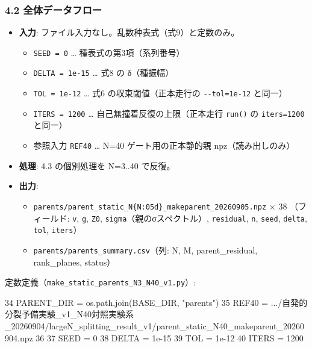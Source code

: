 \documentclass[
  a4paper,
]{ltjsarticle}
\newenvironment{Shaded}{}{}
\newcommand{\DecValTok}[1]{\textcolor[rgb]{0.25,0.63,0.44}{#1}}
\newcommand{\FloatTok}[1]{\textcolor[rgb]{0.25,0.63,0.44}{#1}}
\newcommand{\NormalTok}[1]{#1}
\newcommand{\OperatorTok}[1]{\textcolor[rgb]{0.40,0.40,0.40}{#1}}
\newcommand{\StringTok}[1]{\textcolor[rgb]{0.25,0.44,0.63}{#1}}
\providecommand{\tightlist}{%
  \setlength{\itemsep}{0pt}\setlength{\parskip}{0pt}}
\begin{document}
\subsubsection{4.2
全体データフロー}\label{ux5168ux4f53ux30c7ux30fcux30bfux30d5ux30edux30fc}

\begin{itemize}
\tightlist
\item
  \textbf{入力}: ファイル入力なし。乱数种表式（式9）と定数のみ。

  \begin{itemize}
  \tightlist
  \item
    \texttt{SEED\ =\ 0} \ldots{} 種表式の第3項（系列番号）
  \item
    \texttt{DELTA\ =\ 1e-15} \ldots{} 式8 の δ（種振幅）
  \item
    \texttt{TOL\ =\ 1e-12} \ldots{} 式6 の収束閾値（正本走行の
    \texttt{-\/-tol=1e-12} と同一）
  \item
    \texttt{ITERS\ =\ 1200} \ldots{} 自己無撞着反復の上限（正本走行
    \texttt{run()} の \texttt{iters=1200} と同一）
  \item
    参照入力 \texttt{REF40} \ldots{} N=40 ゲート用の正本静的親
    npz（読み出しのみ）
  \end{itemize}
\item
  \textbf{処理}: 4.3 の個別処理を N=3..40 で反復。
\item
  \textbf{出力}:

  \begin{itemize}
  \tightlist
  \item
    \texttt{parents/parent\_static\_N\{N:05d\}\_makeparent\_20260905.npz}
    × 38 （フィールド: \texttt{v}, \texttt{g}, \texttt{Z0},
    \texttt{sigma}（親のσスペクトル）, \texttt{residual}, \texttt{n},
    \texttt{seed}, \texttt{delta}, \texttt{tol}, \texttt{iters}）
  \item
    \texttt{parents/parents\_summary.csv}（列: N, M, parent\_residual,
    rank\_planes, status）
  \end{itemize}
\end{itemize}

定数定義（\texttt{make\_static\_parents\_N3\_N40\_v1.py}）:

\begin{Shaded}
\begin{Highlighting}[]
    \DecValTok{34}\NormalTok{  PARENT\_DIR }\OperatorTok{=}\NormalTok{ os.path.join(BASE\_DIR, }\StringTok{"parents"}\NormalTok{)}
    \DecValTok{35}\NormalTok{  REF40 }\OperatorTok{=} \StringTok{\textquotesingle{}.../自発的分裂予備実験\_v1\_N40対照実験系\_20260904/largeN\_splitting\_result\_v1/parent\_static\_N40\_makeparent\_20260904.npz\textquotesingle{}}
    \DecValTok{36}
    \DecValTok{37}\NormalTok{  SEED }\OperatorTok{=} \DecValTok{0}
    \DecValTok{38}\NormalTok{  DELTA }\OperatorTok{=} \FloatTok{1e{-}15}
    \DecValTok{39}\NormalTok{  TOL }\OperatorTok{=} \FloatTok{1e{-}12}
    \DecValTok{40}\NormalTok{  ITERS }\OperatorTok{=} \DecValTok{1200}
\end{Highlighting}
\end{Shaded}
\end{document}
